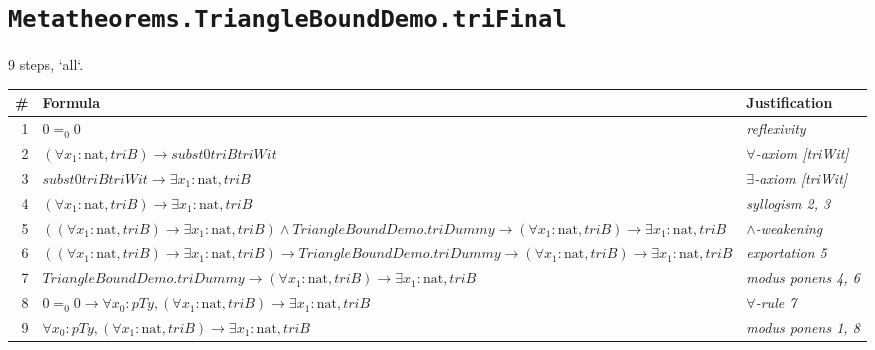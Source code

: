 \section*{\texttt{Metatheorems.TriangleBoundDemo.triFinal}}
9 steps, `all`.

\begin{longtable}{r l l}
\hline
\# & Formula & Justification \\
\hline
\endhead
1 & $0  =_0  0$ & \textit{reflexivity} \\
2 & $(\forall  x_{1} : \mathrm{nat}, triB)  \to  subst0 triB triWit$ & \textit{$\forall$-axiom [triWit]} \\
3 & $subst0 triB triWit  \to  \exists  x_{1} : \mathrm{nat}, triB$ & \textit{$\exists$-axiom [triWit]} \\
4 & $(\forall  x_{1} : \mathrm{nat}, triB)  \to  \exists  x_{1} : \mathrm{nat}, triB$ & \textit{syllogism 2, 3} \\
5 & $((\forall  x_{1} : \mathrm{nat}, triB)  \to  \exists  x_{1} : \mathrm{nat}, triB)  \land  TriangleBoundDemo.triDummy  \to  (\forall  x_{1} : \mathrm{nat}, triB)  \to  \exists  x_{1} : \mathrm{nat}, triB$ & \textit{$\land$-weakening} \\
6 & $((\forall  x_{1} : \mathrm{nat}, triB)  \to  \exists  x_{1} : \mathrm{nat}, triB)  \to  TriangleBoundDemo.triDummy  \to  (\forall  x_{1} : \mathrm{nat}, triB)  \to  \exists  x_{1} : \mathrm{nat}, triB$ & \textit{exportation 5} \\
7 & $TriangleBoundDemo.triDummy  \to  (\forall  x_{1} : \mathrm{nat}, triB)  \to  \exists  x_{1} : \mathrm{nat}, triB$ & \textit{modus ponens 4, 6} \\
8 & $0  =_0  0  \to  \forall  x_{0} : pTy, (\forall  x_{1} : \mathrm{nat}, triB)  \to  \exists  x_{1} : \mathrm{nat}, triB$ & \textit{$\forall$-rule 7} \\
9 & $\forall  x_{0} : pTy, (\forall  x_{1} : \mathrm{nat}, triB)  \to  \exists  x_{1} : \mathrm{nat}, triB$ & \textit{modus ponens 1, 8} \\
\hline
\end{longtable}
